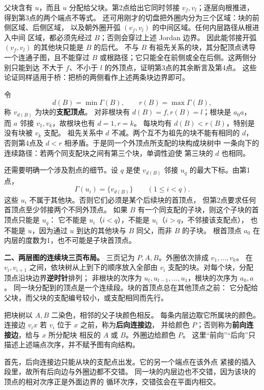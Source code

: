 \begin{solution}
父块含有 $u$，而且 $u$ 分配给父块。第2点给出它同时邻接
$v_f,v_l$；逐层向根推进，得到第3点的两个端点不等式。
还可用刚才的切盘把外圈内分为三个区域：块的前侧区域、后侧区域，
以及朝外圈开弧 $(v_f,v_l)$ 的中间区域。任何内层路径从根进入中间
区域，都必须先经过 $B$；否则会穿过上述 Jordan 边界。
因此能邻接开弧 $(v_f,v_l)$ 的其他块只能是 $B$ 的后代。
不与 $B$ 有祖先关系的块，其分配顶点诱导一个连通子图，且不能穿过
$B$ 或根路径；它只能全在前侧或全在后侧。这两侧分别只能到达
不大于 $f$、不小于 $l$ 的外顶点，证明第3点的其余断言及第4点。
这些论证同样适用于桥：把桥的两侧看作上述两条块边界即可。

令
\[
 d(B)=\min\Gamma(B),\qquad r(B)=\max\Gamma(B),
\]
称 $v_{d(B)}$ 为块的\textbf{支配顶点}。
对非根块有 $d(B)=f,r(B)=l$；根块是 $a_0a$，
而 $a$ 邻接 $v_1,v_k$，故根块也有 $d=1,r=k$。
每块均有 $d(B)<r(B)$，特别是没有块被 $v_k$ 支配。
祖先关系中 $d$ 不减。两个互不为祖先的块不能有相同的 $d$，
否则第4点及 $d<r$ 相矛盾。于是同一个外顶点所支配的块构成块树中
一条向下的连续路径：若两个同支配块之间有第三个块，单调性迫使
第三块的 $d$ 也相同。

还需要明确一个涉及割点的细节。设 $q$ 是使
$v_{d(B)}$ 邻接 $u_q$ 的最大下标。由第1点，
\[
 \Gamma(u_i)=\{v_{d(B)}\}\qquad(1\leq i<q).
\]
这些 $u_i$ 不属于其他块。否则它们必须是某个后续块的首顶点，
但第2点要求任何首顶点至少邻接两个不同外顶点。
如果 $B$ 有一个同支配的子块，则这个子块的首顶点只能是 $u_q$：
它不能是 $u_i$（$i<q$），不能是 $u_i$（$i>q$，不邻接该支配点），
也不能是 $u$，因为通过 $u$ 到达的其他块与 $B$ 同父，而非 $B$ 的子块。
根首顶点 $a_0$ 在内层的度数为1，也不可能是子块首顶点。

\medskip
\noindent\textbf{二、两层图的连续块三页布局。}
三页记为 $P,A,B$。外圈依次排成 $v_1,\ldots,v_k$。
在 $v_i,v_{i+1}$ 之间，依块树从上到下的顺序放入全部由 $v_i$
支配的块。对每个块，分配顶点沿块边界\textbf{逆时针}排列；
非根块的次序为 $u_t,u_{t-1},\ldots,u_1$，根块的次序为 $a_0,a$。
同一块分配到的顶点是一个连续段。块的首顶点总在其他顶点之前：
它分配给父块，而父块的支配编号较小，或支配相同而先行。

把块树以 $A,B$ 二染色，相邻的父子块颜色相反。
每条内层边取它所属块的颜色。
连接边 $v_ix$ 若 $v_i$ 位于 $x$ 之前，称为\textbf{后向连接边}，
并给颜色 $P$；否则称为\textbf{前向连接边}，给与 $x$ 所分配块
相反的 $A$ 或 $B$。外圈边给颜色 $P$。
这里“前向”“后向”只描述上述端点次序，并不赋予图有向结构。

首先，后向连接边只能从块的支配点出发。它的另一个端点在该外点
紧接的插入段里，故所有后向边与外圈边都不交错。
同一块的内层边也不交错，因为该块的顶点的相对次序正是外面边界的
循环次序，交错弦会在平面内相交。


\end{solution}
